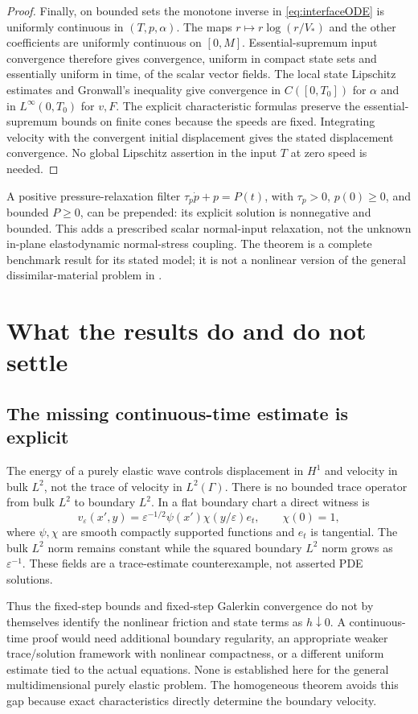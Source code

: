 \documentclass[11pt,a4paper]{article}
\theoremstyle{definition}\newtheorem{definition}[theorem]{Definition}
\theoremstyle{remark}\newtheorem{remark}[theorem]{Remark}
\numberwithin{equation}{section}
\begin{document}
\begin{proof}
Finally, on bounded sets the monotone inverse in \eqref{eq:interfaceODE} is uniformly continuous in $(T,p,\alpha)$. The maps $r\mapsto r\log(r/V_*)$ and the other coefficients are uniformly continuous on $[0,M]$. Essential-supremum input convergence therefore gives convergence, uniform in compact state sets and essentially uniform in time, of the scalar vector fields. The local state Lipschitz estimates and Gronwall's inequality give convergence in $C([0,T_0])$ for $\alpha$ and in $L^\infty(0,T_0)$ for $v,F$. The explicit characteristic formulas preserve the essential-supremum bounds on finite cones because the speeds are fixed. Integrating velocity with the convergent initial displacement gives the stated displacement convergence. No global Lipschitz assertion in the input $T$ at zero speed is needed.
\end{proof}
A positive pressure-relaxation filter $\tau_p\dot p+p=P(t)$, with $\tau_p>0$, $p(0)\ge0$, and bounded $P\ge0$, can be prepended: its explicit solution is nonnegative and bounded. This adds a prescribed scalar normal-input relaxation, not the unknown in-plane elastodynamic normal-stress coupling. The theorem is a complete benchmark result for its stated model; it is not a nonlinear version of the general dissimilar-material problem in \cite{RR,RLR}.

\section{What the results do and do not settle}\label{sec:remaining}
\subsection{The missing continuous-time estimate is explicit}
The energy of a purely elastic wave controls displacement in $H^1$ and velocity in bulk $L^2$, not the trace of velocity in $L^2(\Gamma)$. There is no bounded trace operator from bulk $L^2$ to boundary $L^2$. In a flat boundary chart a direct witness is
\begin{equation}\label{eq:boundarylayer}
 v_\varepsilon(x',y)=\varepsilon^{-1/2}\psi(x')\chi(y/\varepsilon)e_t,
 \qquad \chi(0)=1,
\end{equation}
where $\psi,\chi$ are smooth compactly supported functions and $e_t$ is tangential. The bulk $L^2$ norm remains constant while the squared boundary $L^2$ norm grows as $\varepsilon^{-1}$. These fields are a trace-estimate counterexample, not asserted PDE solutions.

Thus the fixed-step bounds and fixed-step Galerkin convergence do not by themselves identify the nonlinear friction and state terms as $h\downarrow0$. A continuous-time proof would need additional boundary regularity, an appropriate weaker trace/solution framework with nonlinear compactness, or a different uniform estimate tied to the actual equations. None is established here for the general multidimensional purely elastic problem. The homogeneous theorem avoids this gap because exact characteristics directly determine the boundary velocity.
\end{document}
